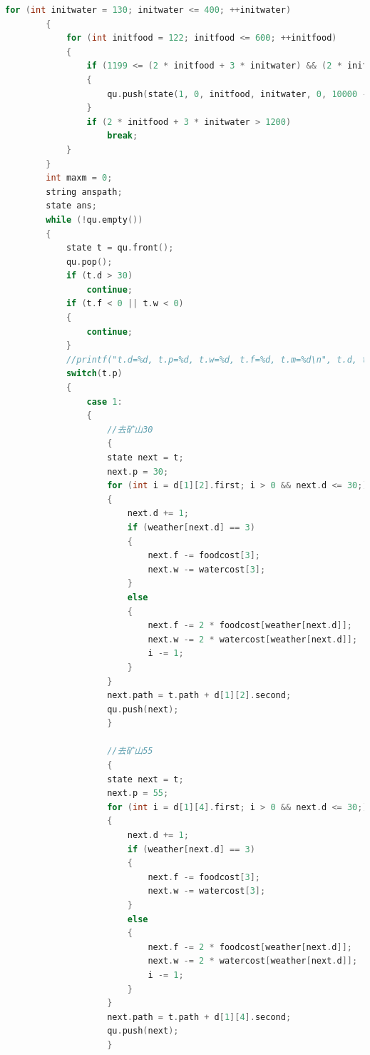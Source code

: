 \documentclass[withoutpreface,bwprint]{cumcmthesis} %
\begin{document}
\begin{appendices}
\begin{lstlisting}[language=c++]
        for (int initwater = 130; initwater <= 400; ++initwater)
        {
            for (int initfood = 122; initfood <= 600; ++initfood)
            {
                if (1199 <= (2 * initfood + 3 * initwater) && (2 * initfood + 3 * initwater) <= 1200)
                {
                    qu.push(state(1, 0, initfood, initwater, 0, 10000 - 5 * initwater - 10 * initfood, "1"));
                }
                if (2 * initfood + 3 * initwater > 1200)
                    break;
            }
        }
        int maxm = 0;
        string anspath;
        state ans;
        while (!qu.empty())
        {
            state t = qu.front();
            qu.pop();
            if (t.d > 30)
                continue;
            if (t.f < 0 || t.w < 0)
            {
                continue;
            }
            //printf("t.d=%d, t.p=%d, t.w=%d, t.f=%d, t.m=%d\n", t.d, t.p, t.w, t.f, t.m);
            switch(t.p)
            {
                case 1:
                {
                    //去矿山30
                    {
                    state next = t;
                    next.p = 30;
                    for (int i = d[1][2].first; i > 0 && next.d <= 30;)
                    {
                        next.d += 1;
                        if (weather[next.d] == 3)
                        {
                            next.f -= foodcost[3];
                            next.w -= watercost[3];
                        }
                        else
                        {
                            next.f -= 2 * foodcost[weather[next.d]];
                            next.w -= 2 * watercost[weather[next.d]];
                            i -= 1;
                        }
                    }
                    next.path = t.path + d[1][2].second;
                    qu.push(next);
                    }
    
                    //去矿山55
                    {
                    state next = t;
                    next.p = 55;
                    for (int i = d[1][4].first; i > 0 && next.d <= 30;)
                    {
                        next.d += 1;
                        if (weather[next.d] == 3)
                        {
                            next.f -= foodcost[3];
                            next.w -= watercost[3];
                        }
                        else
                        {
                            next.f -= 2 * foodcost[weather[next.d]];
                            next.w -= 2 * watercost[weather[next.d]];
                            i -= 1;
                        }
                    }
                    next.path = t.path + d[1][4].second;
                    qu.push(next);
                    }
    

\end{lstlisting}
\end{appendices}
\end{document}

